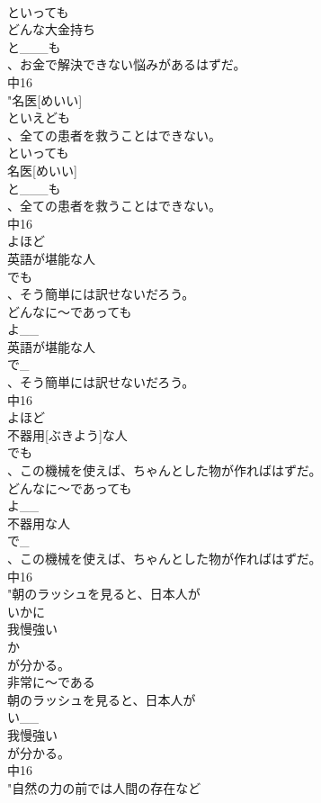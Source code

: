 \documentclass[8pt]{extreport}
\begin{document}
\begin{CJK}{UTF8}{min}
\\	といっても　
\\	どんな大金持ち
\\	と___も
\\	、お金で解決できない悩みがあるはずだ。
\\	中16
\\	"名医[めいい]
\\	といえども
\\	、全ての患者を救うことはできない。
\\	といっても　
\\	名医[めいい]
\\	と___も
\\	、全ての患者を救うことはできない。
\\	中16
\\	よほど
\\	英語が堪能な人
\\	でも
\\	、そう簡単には訳せないだろう。
\\	どんなに～であっても　
\\	よ__
\\	英語が堪能な人
\\	で_
\\	、そう簡単には訳せないだろう。
\\	中16
\\	よほど
\\	不器用[ぶきよう]な人
\\	でも
\\	、この機械を使えば、ちゃんとした物が作ればはずだ。
\\	どんなに～であっても　
\\	よ__
\\	不器用な人
\\	で_
\\	、この機械を使えば、ちゃんとした物が作ればはずだ。
\\	中16
\\	"朝のラッシュを見ると、日本人が
\\	いかに
\\	我慢強い
\\	か
\\	が分かる。
\\	非常に～である 
\\	朝のラッシュを見ると、日本人が
\\	い__
\\	我慢強い
\\	が分かる。
\\	中16
\\	"自然の力の前では人間の存在など

\end{CJK}
\end{document}
